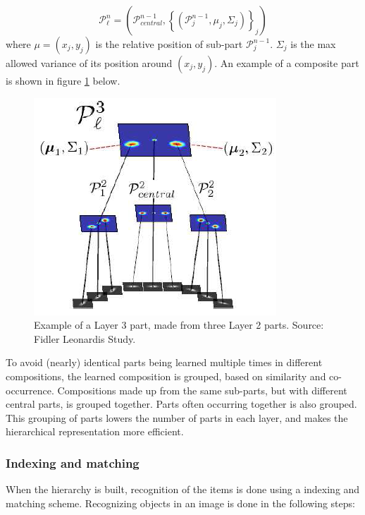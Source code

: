 \begin{equation}
\mathcal{P}_{\ell}^n = \left(\mathcal{P}_{central}^{n-1} , \left\{\left(\mathcal{P}_j^{n-1}, \mu_j, \Sigma_j \right) \right\}_j \right)
\label{eqn:composition_of_parts}
\end{equation}
where $\mu = (x_j, y_j)$ is the relative position of sub-part $\mathcal{P}_{j}^{n-1}$. 
$\Sigma_j$ is the max allowed variance of its position around $(x_j, y_j)$. An example of a composite part is shown in figure \ref{fig:compositionality2} below.

\begin{figure}[h!] %
\centering
\includegraphics[scale=0.7]{graphics/compositionality2}
\caption{Example of a Layer 3 part, made from three Layer 2 parts. Source: Fidler Leonardis Study. }
\label{fig:compositionality2}
\end{figure}

To avoid (nearly) identical parts being learned multiple times in different compositions, the learned composition is grouped, based on similarity and co-occurrence. 
Compositions made up from the same sub-parts, but with different central parts, is grouped together. Parts often occurring together is also grouped. This grouping of parts lowers the number of parts in each layer, and makes the hierarchical representation more efficient. 

\subsubsection{Indexing and matching}
\label{sec:indexing-matching}
When the hierarchy is built, recognition of the items is done using a indexing and matching scheme. Recognizing objects in an image is done in the following steps: 

